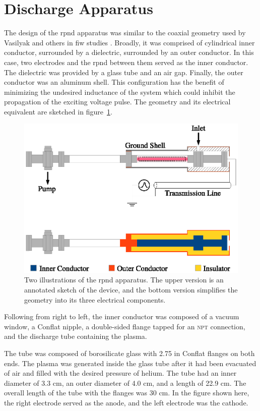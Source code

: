 \section{Discharge Apparatus}

The design of the \acs{rpnd} apparatus was similar to the coaxial geometry used
by Vasilyak and others in \acs{fiw} studies \cite{Vasilyak1994}. Broadly, it was
comprised of cylindrical inner conductor, surrounded by a dielectric, surrounded
by an outer conductor. In this case, two electrodes and the \acs{rpnd} between
them served as the inner conductor. The dielectric was provided by a glass tube
and an air gap. Finally, the outer conductor was an aluminum shell. This
configuration has the benefit of minimizing the undesired inductance of the
system which could inhibit the propagation of the exciting voltage pulse.
The geometry and its electrical equivalent are sketched in
figure~\ref{fig:appschem}.
\begin{figure}
  \centering
  \includegraphics{./chapters/experiment/figures/appschem.eps}
  \caption{Two illustrations of the \acs{rpnd} apparatus. The upper version is
    an annotated sketch of the device, and the bottom version simplifies the
    geometry into its three electrical components.}
  \label{fig:appschem}
\end{figure}
Following from right to left, the inner conductor was composed of a vacuum
window, a Conflat nipple, a double-sided flange tapped for an \textsc{npt}
connection, and the discharge tube containing the plasma.

The tube was composed of borosilicate glass with 2.75 in Conflat flanges on both
ends. The plasma was generated inside the glass tube after it had been evacuated
of air and filled with the desired pressure of helium. The tube had an inner
diameter of 3.3 cm, an outer diameter of 4.0 cm, and a length of 22.9 cm. The
overall length of the tube with the flanges was 30 cm. In the figure shown here,
the right electrode served as the anode, and the left electrode was the cathode.

